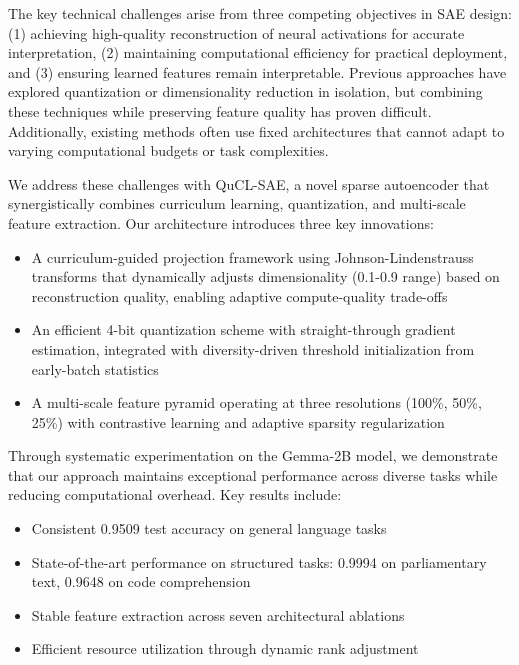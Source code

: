 \documentclass{article} %
\begin{document}
The key technical challenges arise from three competing objectives in SAE design: (1) achieving high-quality reconstruction of neural activations for accurate interpretation, (2) maintaining computational efficiency for practical deployment, and (3) ensuring learned features remain interpretable. Previous approaches have explored quantization \cite{Han2015DeepCC} or dimensionality reduction \cite{Ailon2009TheFJ} in isolation, but combining these techniques while preserving feature quality has proven difficult. Additionally, existing methods often use fixed architectures that cannot adapt to varying computational budgets or task complexities.

We address these challenges with QuCL-SAE, a novel sparse autoencoder that synergistically combines curriculum learning, quantization, and multi-scale feature extraction. Our architecture introduces three key innovations:

\begin{itemize}
    \item A curriculum-guided projection framework using Johnson-Lindenstrauss transforms that dynamically adjusts dimensionality (0.1-0.9 range) based on reconstruction quality, enabling adaptive compute-quality trade-offs
    \item An efficient 4-bit quantization scheme with straight-through gradient estimation, integrated with diversity-driven threshold initialization from early-batch statistics
    \item A multi-scale feature pyramid operating at three resolutions (100\%, 50\%, 25\%) with contrastive learning and adaptive sparsity regularization
\end{itemize}

Through systematic experimentation on the Gemma-2B model, we demonstrate that our approach maintains exceptional performance across diverse tasks while reducing computational overhead. Key results include:

\begin{itemize}
    \item Consistent 0.9509 test accuracy on general language tasks
    \item State-of-the-art performance on structured tasks: 0.9994 on parliamentary text, 0.9648 on code comprehension
    \item Stable feature extraction across seven architectural ablations
    \item Efficient resource utilization through dynamic rank adjustment
\end{itemize}
\end{document}
